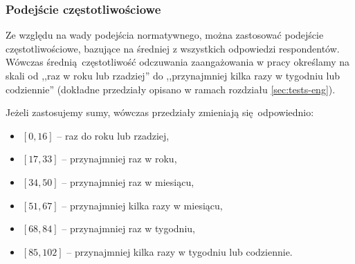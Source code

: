 \subsubsection{Podejście częstotliwościowe}
Ze względu na wady podejścia normatywnego, można zastosować podejście częstotliwościowe, bazujące na średniej z wszystkich odpowiedzi respondentów. Wówczas średnią częstotliwość odczuwania zaangażowania w pracy określamy na skali od ,,raz w roku lub rzadziej'' do ,,przynajmniej kilka razy w tygodniu lub codziennie'' (dokładne przedziały opisano w ramach rozdziału \ref{sec:tests-eng}).

Jeżeli zastosujemy sumy, wówczas przedziały zmieniają się odpowiednio:
\begin{itemize}
\item $[0, 16]$ -- raz do roku lub rzadziej,
\item $[17, 33]$ -- przynajmniej raz w roku,
\item $[34, 50]$ -- przynajmniej raz w miesiącu,
\item $[51, 67]$ -- przynajmniej kilka razy w miesiącu,
\item $[68, 84]$ -- przynajmniej raz w tygodniu,
\item $[85, 102]$ -- przynajmniej kilka razy w tygodniu lub codziennie. 
\end{itemize}
